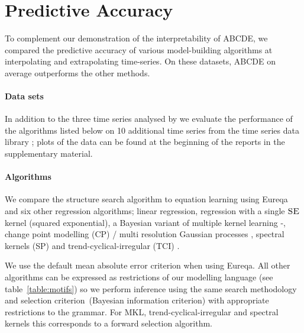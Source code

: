 \documentclass[letterpaper]{article}
\def\eg{e.g.\ }
\newcommand{\procedurename}{ABCDE}
\begin{document}
\section{Predictive Accuracy}
\label{sec:numerical}

To complement our demonstration of the interpretability of \procedurename{}, we compared the predictive accuracy of various model-building algorithms at interpolating and extrapolating time-series.
On these datasets, \procedurename{} on average outperforms the other methods.%

\paragraph{Data sets}

In addition to the three time series analysed by \cite{DuvLloGroetal13} we evaluate the performance of the algorithms listed below on 10 additional time series from the time series data library \citep{TSDL}; plots of the data can be found at the beginning of the reports in the supplementary material.

\paragraph{Algorithms}

We compare the structure search algorithm to equation learning using Eureqa \citep{Eureqa} and six other regression algorithms; linear regression, \gp{} regression with a single ${\textsc{SE}}$ kernel (squared exponential), a Bayesian variant of multiple kernel learning \citep[e.g.][]{bach2004multiple}-, change point modelling (CP) / multi resolution Gaussian processes \citep[e.g.][]{garnett2010sequential, FoxDunson:NIPS2012}, spectral kernels (SP) \citep{WilAda13} and trend-cyclical-irregular (TCI) \citep[e.g.][]{lind2006basic}.

We use the default mean absolute error criterion when using Eureqa.
All other algorithms can be expressed as restrictions of our modelling language (see table~\ref{table:motifs}) so we perform inference using the same search methodology and selection criterion\footnotemark~(Bayesian information criterion) with appropriate restrictions to the grammar.
For MKL, trend-cyclical-irregular and spectral kernels this corresponds to a forward selection algorithm.
\end{document}
